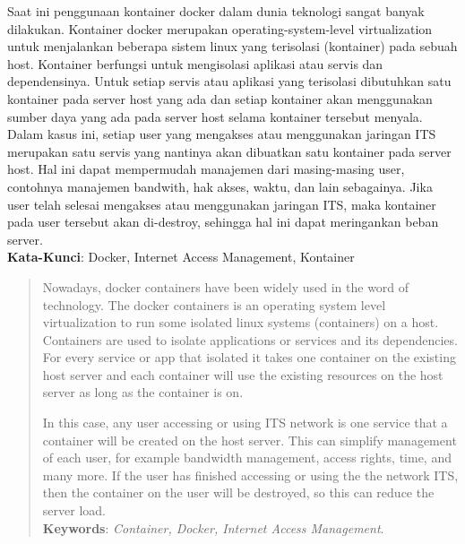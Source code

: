 \begin{abstrak}
	\indent Saat ini penggunaan kontainer docker dalam dunia teknologi sangat banyak dilakukan. Kontainer docker merupakan operating-system-level virtualization untuk menjalankan beberapa sistem linux yang terisolasi (kontainer) pada sebuah host. Kontainer berfungsi untuk mengisolasi aplikasi atau servis dan dependensinya. Untuk setiap servis atau aplikasi yang terisolasi dibutuhkan satu kontainer pada server host yang ada dan setiap kontainer akan menggunakan sumber daya yang ada pada server host selama kontainer tersebut menyala.\\
    	\indent Dalam kasus ini, setiap user yang mengakses atau menggunakan jaringan ITS merupakan satu servis yang nantinya akan dibuatkan satu kontainer pada server host. Hal ini dapat mempermudah manajemen dari masing-masing user, contohnya manajemen bandwith, hak akses, waktu, dan lain sebagainya. Jika user telah selesai mengakses atau menggunakan jaringan ITS, maka kontainer pada user tersebut akan di-destroy, sehingga hal ini dapat meringankan beban server.\\

\noindent \textbf{Kata-Kunci}:  Docker, Internet Access Management, Kontainer
\end{abstrak}

\cleardoublepage
\begin{abstract}
	\indent Nowadays, docker containers have been widely used in the word of technology. The docker containers is an operating system level virtualization to run some isolated linux systems (containers) on a host. Containers are used to isolate applications or services and its dependencies. For every service or app that isolated it takes one container on the existing host server and each container will use the existing resources on the host server as long as the container is on.
	
	In this case, any user accessing or using ITS network is one service that a container will be created on the host server. This can simplify management of each user, for example bandwidth management, access rights, time, and many more. If the user has finished accessing or using the the network ITS, then the container on the user will be destroyed, so this can reduce the server load. \\

\noindent \textbf{Keywords}:  \textit{Container, Docker, Internet Access Management}.
\end{abstract}